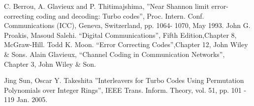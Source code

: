 \documentclass[conference]{IEEEtran}
\begin{document}
\begin{thebibliography}{99}
  C. Berrou, A. Glavieux and P. Thitimajshima, 
''Near Shannon limit error-correcting coding and
decoding: Turbo codes'', Proc. Intern. Conf. Communications (ICC), Geneva, 
Switzerland, pp. 1064-
1070, May 1993.
 John G. Proakis, Masoud Salehi. ``Digital Communications'', 
Fifth Edition,Chapter 8, McGraw-Hill.
 Todd K. Moon. ``Error Correcting Codes'',Chapter 12, John Wiley \& Sons.
Alain Glavieux, ``Channel Coding in Communication Networks'',\\ Chapter 3, John Wiley \& Son. 

 Jing Sun, Oscar Y. Takeshita ''Interleavers for Turbo Codes Using 
Permutation Polynomials over Integer Rings'', IEEE Trans. Inform. Theory, vol. 51, 
pp. 101 - 119  Jan. 2005.

\end{thebibliography}

%
\end{document}
